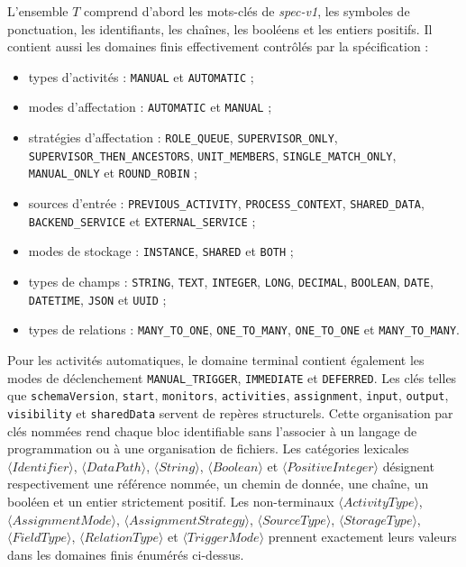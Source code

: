 L'ensemble $T$ comprend d'abord les mots-clés de \textit{spec-v1}, les symboles
de ponctuation, les identifiants, les chaînes, les booléens et les entiers
positifs. Il contient aussi les domaines finis effectivement contrôlés par la
spécification :

\begin{sloppypar}
\begin{itemize}
    \item types d'activités : \texttt{MANUAL} et \texttt{AUTOMATIC} ;
    \item modes d'affectation : \texttt{AUTOMATIC} et \texttt{MANUAL} ;
    \item stratégies d'affectation : \texttt{ROLE\_QUEUE},
    \texttt{SUPERVISOR\_ONLY}, \texttt{SUPERVISOR\_THEN\_ANCESTORS},
    \texttt{UNIT\_MEMBERS}, \texttt{SINGLE\_MATCH\_ONLY},
    \texttt{MANUAL\_ONLY} et \texttt{ROUND\_ROBIN} ;
    \item sources d'entrée : \texttt{PREVIOUS\_ACTIVITY},
    \texttt{PROCESS\_CONTEXT}, \texttt{SHARED\_DATA},
    \texttt{BACKEND\_SERVICE} et \texttt{EXTERNAL\_SERVICE} ;
    \item modes de stockage : \texttt{INSTANCE}, \texttt{SHARED} et
    \texttt{BOTH} ;
    \item types de champs : \texttt{STRING}, \texttt{TEXT},
    \texttt{INTEGER}, \texttt{LONG}, \texttt{DECIMAL}, \texttt{BOOLEAN},
    \texttt{DATE}, \texttt{DATETIME}, \texttt{JSON} et \texttt{UUID} ;
    \item types de relations : \texttt{MANY\_TO\_ONE},
    \texttt{ONE\_TO\_MANY}, \texttt{ONE\_TO\_ONE} et
    \texttt{MANY\_TO\_MANY}.
\end{itemize}
\end{sloppypar}

Pour les activités automatiques, le domaine terminal contient également les
modes de déclenchement \texttt{MANUAL\_TRIGGER}, \texttt{IMMEDIATE} et
\texttt{DEFERRED}. Les clés telles que \texttt{schemaVersion}, \texttt{start},
\texttt{monitors}, \texttt{activities}, \texttt{assignment}, \texttt{input},
\texttt{output}, \texttt{visibility} et \texttt{sharedData} servent de repères
structurels. Cette organisation par clés nommées rend chaque bloc identifiable
sans l'associer à un langage de programmation ou à une organisation de fichiers.
Les catégories lexicales $\langle Identifier\rangle$, $\langle DataPath\rangle$,
$\langle String\rangle$, $\langle Boolean\rangle$ et
$\langle PositiveInteger\rangle$ désignent respectivement une référence nommée,
un chemin de donnée, une chaîne, un booléen et un entier strictement positif. Les
non-terminaux $\langle ActivityType\rangle$, $\langle AssignmentMode\rangle$,
$\langle AssignmentStrategy\rangle$, $\langle SourceType\rangle$,
$\langle StorageType\rangle$, $\langle FieldType\rangle$,
$\langle RelationType\rangle$ et $\langle TriggerMode\rangle$ prennent exactement
leurs valeurs dans les domaines finis énumérés ci-dessus.

